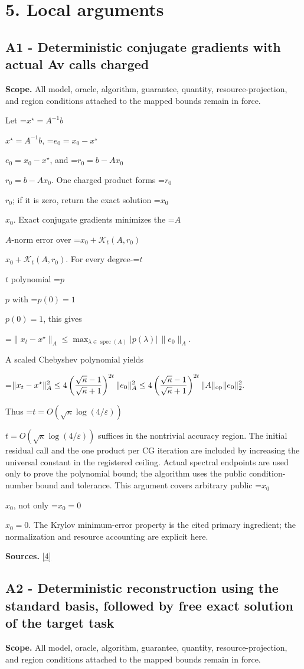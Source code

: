 \documentclass[10pt,a4paper]{article}
\newcommand{\AtlasMath}[1]{\par\begingroup\centering\setbox0=\hbox{$\displaystyle #1$}\ifdim\wd0>1.4\linewidth\typeout{ATLAS WIDE FORMULA: \the\wd0}\fi\ifdim\wd0>\linewidth\resizebox{\linewidth}{!}{\box0}\else\box0\fi\par\endgroup}
\newcommand{\AtlasInlineMath}[1]{\begingroup\setbox0=\hbox{$#1$}\ifdim\wd0>.4\linewidth\endgroup\AtlasMath{#1}\else\endgroup$#1$\fi}
\begin{document}
\section{5. Local arguments}
\subsection{A1 - Deterministic conjugate gradients with actual Av calls charged}
\textbf{Scope.} All model, oracle, algorithm, guarantee, quantity, resource-projection, and region conditions attached to the mapped bounds remain in force.

Let \AtlasInlineMath{x^\star=A^{-1}b}, \AtlasInlineMath{e_0=x_0-x^\star}, and \AtlasInlineMath{r_0=b-Ax_0}. One charged product forms \AtlasInlineMath{r_0}; if it is zero, return the exact solution \AtlasInlineMath{x_0}. Exact conjugate gradients minimizes the \AtlasInlineMath{A}-norm error over \AtlasInlineMath{x_0+\mathcal K_t(A,r_0)}. For every degree-\AtlasInlineMath{t} polynomial \AtlasInlineMath{p} with \AtlasInlineMath{p(0)=1}, this gives

\AtlasMath{\|x_t-x^\star\|_A\le\max_{\lambda\in\operatorname{spec}(A)}|p(\lambda)|\,\|e_0\|_A.}

A scaled Chebyshev polynomial yields

\AtlasMath{\|x_t-x^\star\|_A^2\le4\left(\frac{\sqrt\kappa-1}{\sqrt\kappa+1}\right)^{2t}\|e_0\|_A^2\le4\left(\frac{\sqrt\kappa-1}{\sqrt\kappa+1}\right)^{2t}\|A\|_{\rm op}\|e_0\|_2^2.}

Thus \AtlasInlineMath{t=O(\sqrt\kappa\log(4/\varepsilon))} suffices in the nontrivial accuracy region. The initial residual call and the one product per CG iteration are included by increasing the universal constant in the registered ceiling. Actual spectral endpoints are used only to prove the polynomial bound; the algorithm uses the public condition-number bound and tolerance. This argument covers arbitrary public \AtlasInlineMath{x_0}, not only \AtlasInlineMath{x_0=0}. The Krylov minimum-error property is the cited primary ingredient; the normalization and resource accounting are explicit here.

\textbf{Sources.} \href{https://arxiv.org/pdf/1708.07788v2}{[4]}

\subsection{A2 - Deterministic reconstruction using the standard basis, followed by free exact solution of the target task}
\textbf{Scope.} All model, oracle, algorithm, guarantee, quantity, resource-projection, and region conditions attached to the mapped bounds remain in force.
\end{document}
